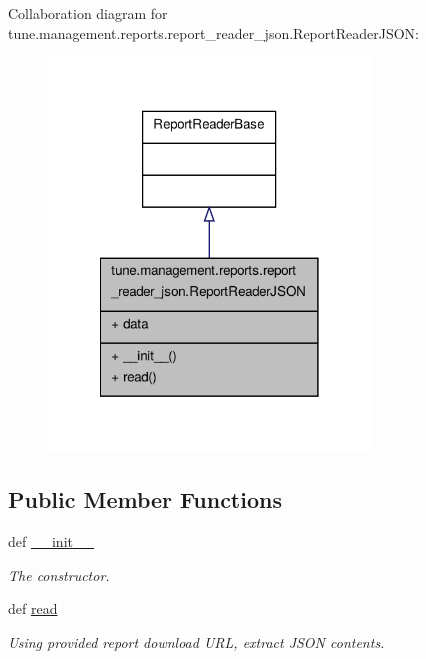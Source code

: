 Collaboration diagram for tune.\-management.\-reports.\-report\-\_\-reader\-\_\-json.\-Report\-Reader\-J\-S\-O\-N\-:
\nopagebreak
\begin{figure}[H]
\begin{center}
\leavevmode
\includegraphics[width=242pt]{classtune_1_1management_1_1reports_1_1report__reader__json_1_1ReportReaderJSON__coll__graph}
\end{center}
\end{figure}
\subsection*{Public Member Functions}
\begin{DoxyCompactItemize}
\item 
def \hyperlink{classtune_1_1management_1_1reports_1_1report__reader__json_1_1ReportReaderJSON_aa828e0e4a41834a6a678224676df232c}{\-\_\-\-\_\-init\-\_\-\-\_\-}
\begin{DoxyCompactList}\small\item\em The constructor. \end{DoxyCompactList}\item 
def \hyperlink{classtune_1_1management_1_1reports_1_1report__reader__json_1_1ReportReaderJSON_a9690c4e4ce8f0e9ab5e827eafbc9ccdf}{read}
\begin{DoxyCompactList}\small\item\em Using provided report download U\-R\-L, extract J\-S\-O\-N contents. \end{DoxyCompactList}\end{DoxyCompactItemize}
